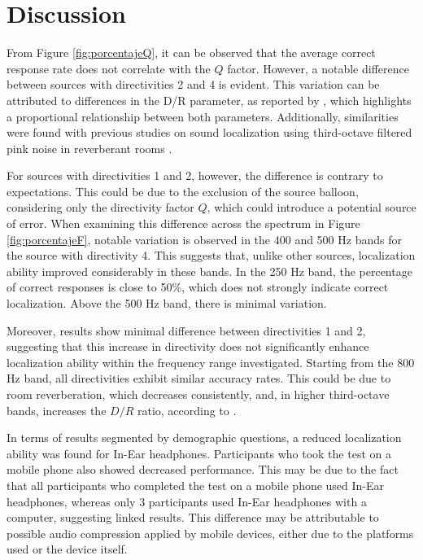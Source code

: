\section{\large\textbf{Discussion}}
From Figure \ref{fig:porcentajeQ}, it can be observed that the average correct response rate does not correlate with the $Q$ factor. However, a notable difference between sources with directivities 2 and 4 is evident. This variation can be attributed to differences in the D/R parameter, as reported by \textcite{espectrorev}, which highlights a proportional relationship between both parameters. Additionally, similarities were found with previous studies on sound localization using third-octave filtered pink noise in reverberant rooms \parencite{rev1}.

For sources with directivities 1 and 2, however, the difference is contrary to expectations. This could be due to the exclusion of the source balloon, considering only the directivity factor $Q$, which could introduce a potential source of error. When examining this difference across the spectrum in Figure \ref{fig:porcentajeF}, notable variation is observed in the 400 and 500 Hz bands for the source with directivity 4. This suggests that, unlike other sources, localization ability improved considerably in these bands. In the 250 Hz band, the percentage of correct responses is close to 50\%, which does not strongly indicate correct localization. Above the 500 Hz band, there is minimal variation.

Moreover, results show minimal difference between directivities 1 and 2, suggesting that this increase in directivity does not significantly enhance localization ability within the frequency range investigated. Starting from the 800 Hz band, all directivities exhibit similar accuracy rates. This could be due to room reverberation, which decreases consistently, and, in higher third-octave bands, increases the $D/R$ ratio, according to \textcite{Hartmann}.

In terms of results segmented by demographic questions, a reduced localization ability was found for In-Ear headphones. Participants who took the test on a mobile phone also showed decreased performance. This may be due to the fact that all participants who completed the test on a mobile phone used In-Ear headphones, whereas only 3 participants used In-Ear headphones with a computer, suggesting linked results. This difference may be attributable to possible audio compression applied by mobile devices, either due to the platforms used or the device itself.
